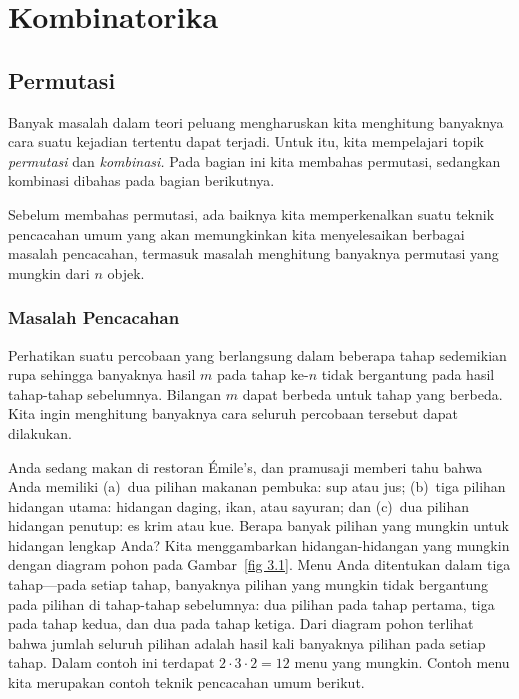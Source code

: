 \chapter{Kombinatorika}\label{chp 3} 

\section{Permutasi}\label{sec 3.1}

Banyak masalah dalam teori peluang mengharuskan kita menghitung banyaknya cara suatu
kejadian tertentu dapat terjadi.  Untuk itu, kita mempelajari topik {\em permutasi} dan
{\em kombinasi.}  Pada bagian ini kita membahas permutasi, sedangkan kombinasi dibahas
pada bagian berikutnya.

Sebelum membahas permutasi, ada baiknya kita memperkenalkan suatu teknik pencacahan umum
yang akan memungkinkan kita menyelesaikan berbagai masalah pencacahan, termasuk masalah
menghitung banyaknya permutasi yang mungkin dari $n$ objek.
 
\subsection*{Masalah Pencacahan}

Perhatikan suatu percobaan yang berlangsung dalam beberapa tahap sedemikian rupa sehingga
banyaknya hasil $m$ pada tahap ke-$n$ tidak bergantung pada hasil tahap-tahap sebelumnya.
Bilangan $m$ dapat berbeda untuk tahap yang berbeda.  Kita ingin menghitung banyaknya cara
seluruh percobaan tersebut dapat dilakukan.

\begin{example}\label{exam 3.1} Anda sedang makan di restoran \'Emile's, dan pramusaji memberi tahu bahwa Anda memiliki (a)~dua pilihan makanan
pembuka: sup atau jus;  (b)~tiga pilihan hidangan utama: hidangan daging, ikan, atau
sayuran; dan (c)~dua pilihan hidangan penutup: es krim atau kue.  Berapa banyak pilihan
yang mungkin untuk hidangan lengkap Anda?  Kita menggambarkan hidangan-hidangan yang
mungkin dengan diagram pohon pada Gambar~\ref{fig 3.1}.  Menu Anda ditentukan dalam tiga
tahap---pada setiap tahap, banyaknya pilihan yang mungkin tidak bergantung pada pilihan
di tahap-tahap sebelumnya: dua pilihan pada tahap pertama, tiga pada tahap kedua, dan
dua pada tahap ketiga.  Dari diagram pohon terlihat bahwa jumlah seluruh pilihan adalah
hasil kali banyaknya pilihan pada setiap tahap.  Dalam contoh ini terdapat
$2 \cdot 3 \cdot 2 = 12$ menu yang mungkin.  Contoh menu kita merupakan contoh teknik
pencacahan umum berikut.
\end{example}

